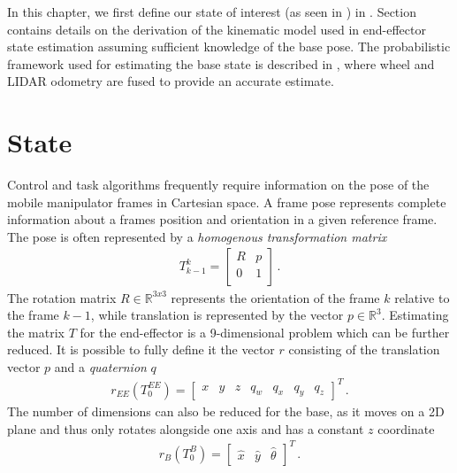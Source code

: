 \documentclass[times, utf8, diplomski, english]{fer}
\begin{document}
In this chapter, we first define our state of interest (as seen in ) in . 
Section  contains details on the derivation of the kinematic model used in end-effector state estimation assuming sufficient knowledge of the base pose. 
The probabilistic framework used for estimating the base state is described in , where wheel and LIDAR odometry are fused to provide an accurate estimate.

\section{State}\label{section:State}
Control and task algorithms frequently require information on the pose of the mobile manipulator frames in Cartesian space. 
A frame pose represents complete information about a frames position and orientation in a given reference frame.
The pose is often represented by a \textit{homogenous transformation matrix}
\begin{align}
T_{k-1}^k =
\begin{bmatrix}
R & p\\
0 & 1\\
\end{bmatrix}\,.
\label{eq:transform}
\end{align}
The rotation matrix $R \in \mathbb{R}^{3x3}$ represents the orientation of the frame $k$ relative to the frame $k-1 $, while translation is represented by the vector $p \in \mathbb{R}^3$.
Estimating the matrix $T$ for the end-effector is a 9-dimensional problem which can be further reduced. 
It is possible to fully define it the vector $r$ consisting of the translation vector $p$ and a \textit{quaternion} $q$
\begin{align} 
r_{EE}\left(T_{0}^{EE}\right) = 
\begin{bmatrix}
x& y& z& q_w& q_x& q_y& q_z
\end{bmatrix}^T\, .
\label{eq:pose}
\end{align}
The number of dimensions can also be reduced for the base, as it moves on a 2D plane and thus only rotates alongside one axis and has a constant $z$ coordinate
\begin{align}\label{eq:pose base}
r_{B}\left(T_{0}^{B}\right) = 
\begin{bmatrix}
\hat{x}& \hat{y}& \hat{\theta}
\end{bmatrix}^T\, .
\end{align}
\end{document}
